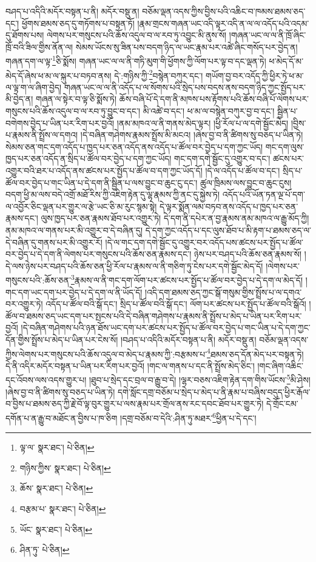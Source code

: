 བཤད་པ་འདིའི་མདོར་བསྟན་པ་ནི། མདོར་བསྡུ་ན། བཅོམ་ལྡན་འདས་ཀྱིས་བྱིས་པའི་འཆིང་བ་ཁམས་ཐམས་ཅད་དང་། ཕྱོགས་ཐམས་ཅད་དུ་གཏོགས་པ་བསྟན་ཏོ། །རྣམ་གྲངས་གཞན་ཡང་འདི་ལྟར་འདི་ན་ལ་ལ་འདོད་པའི་འདམ་དུ་ཐོགས་པས། ལེགས་པར་གསུངས་པའི་ཆོས་འདུལ་བ་ལ་རབ་ཏུ་འབྱུང་མི་ནུས་སོ། །གཞན་ཡང་ལ་ལ་ནི་ཁྲོ་ཞིང་ཁྲོ་བའི་ཟིལ་གྱིས་ནོན་ལ། སེམས་ཡོངས་སུ་ཟིན་པས་བདག་ཉིད་ལ་ཡང་རྣམ་པར་འཚེ་ཞིང་གསོད་པར་བྱེད་ན། གཞན་དག་ལ་ལྟ་\footnote{ལྟ་ལ་  སྣར་ཐང་།  པེ་ཅིན། }ཅི་སྨོས། གཞན་ཡང་ལ་ལ་ནི་གཏི་མུག་གི་ཕྱོགས་ཀྱི་ལོག་པར་ལྟ་བ་དང་ལྡན་ཏེ། ཕ་མེད་དོ་མ་མེད་དོ་ཞེས་ཕ་མ་ལ་སྐུར་པ་བཏབ་ནས། དེ་:གཉིས་ཀྱི་\footnote{གཉིས་ཀྱིས་  སྣར་ཐང་།  པེ་ཅིན། }བསྙེན་བཀུར་དང་། གཡོག་བྱ་བར་འདོད་ཀྱི་ཕྱིར་ཏེ་ཕ་མ་ལ་ལྟ་ག་ལ་ཞིག་བྱེད། གཞན་ཡང་ལ་ལ་ནི་འདོད་པ་ལ་སོགས་པའི་སྲེད་པས་བདས་ནས་བདག་ཉིད་ཀྱང་སྤྱོད་པར་མི་བྱེད་ན། གཞན་ལ་སྟེར་བ་ལྟ་ཅི་སྨོས་ཏེ། ཆོས་བཞི་པོ་དེ་དག་ནི་མཁས་པས་རྟོགས་པའི་ཆོས་བཞི་པོ་ལེགས་པར་གསུངས་པའི་ཆོས་འདུལ་བ་ལ་རབ་ཏུ་བྱུང་བ་དང་། མི་འཚེ་བ་དང་། ཕ་མ་ལ་བསྙེན་བཀུར་བྱ་བ་དང་། སྦྱིན་པ་བགེགས་བྱེད་པ་ཡིན་པར་རིག་པར་བྱའོ། །ནམ་མཁའ་ལ་ནི་གནས་མེད་ལྟར། །ཕྱི་རོལ་པ་ལ་དགེ་སྦྱོང་མེད། །བྱིས་པ་རྣམས་ནི་སྤྲོས་ལ་དགའ། །དེ་བཞིན་གཤེགས་རྣམས་སྤྲོས་མི་མངའ། །ཞེས་བྱ་བ་ནི་ཚིགས་སུ་བཅད་པ་ཡིན་ཏེ། སེམས་ཅན་གང་དག་འདོད་པ་ཁྱད་པར་ཅན་འདོད་ནས་འདོད་པ་ཚོལ་བར་བྱེད་པ་དག་ཀྱང་ཡོད། གང་དག་ལུས་ཁྱད་པར་ཅན་འདོད་ན་སྲིད་པ་ཚོལ་བར་བྱེད་པ་དག་ཀྱང་ཡོད། གང་དག་དགེ་སྦྱོང་དུ་འགྱུར་བ་དང་། ཚངས་པར་འགྱུར་བའི་ཐར་པ་འདོད་ནས་ཚངས་པར་སྤྱོད་པ་ཚོལ་བ་དག་ཀྱང་ཡོད་དོ། །དེ་ལ་འདོད་པ་ཚོལ་བ་དང་། སྲིད་པ་ཚོལ་བར་བྱེད་པ་གང་ཡིན་པ་དེ་དག་ནི་སྦྱིན་པ་ལས་བྱུང་བ་ཆུང་ངུ་དང་། ཚུལ་ཁྲིམས་ལས་བྱུང་བ་ཆུང་ངུས། བདག་ཕྱི་མ་ལས་བདེ་འགྲོ་མཐོ་རིས་ཀྱི་འཇིག་རྟེན་དུ་ལྷ་རྣམས་ཀྱི་ནང་དུ་སྐྱེས་ཏེ། འདོད་པའི་ཡོན་ཏན་ལྔ་པོ་དག་ལ་འབྱོར་ཅིང་ལྡན་པར་གྱུར་ལ་རྩེ་ཡང་ཅི་མ་རུང་སྙམ་སྟེ། དེ་ལྟར་སྨོན་ལམ་བཏབ་ནས་འདོད་པ་ཁྱད་པར་ཅན་རྣམས་དང་། ལུས་ཁྱད་པར་ཅན་རྣམས་ཐོབ་པར་འགྱུར་ཏེ། དེ་དག་ནི་དཔེར་ན་བྱ་རྣམས་ནམ་མཁའ་ལ་རྒྱུ་མོད་ཀྱི། ནམ་མཁའ་ལ་གནས་པར་མི་འགྱུར་བ་དེ་བཞིན་དུ། དེ་དག་ཀྱང་འདོད་པ་དང་ལུས་ཐོབ་པ་མི་རྟག་པ་ཐམས་ཅད་ལ་དེ་བཞིན་དུ་གནས་པར་མི་འགྱུར་རོ། །དེ་ལ་གང་དག་དགེ་སྦྱོང་དུ་འགྱུར་བར་འདོད་པས་ཚངས་པར་སྤྱོད་པ་ཚོལ་བར་བྱེད་པ་དེ་དག་ནི་ལེགས་པར་གསུངས་པའི་ཆོས་ཅན་རྣམས་དང་། ཉེས་པར་བཤད་པའི་ཆོས་ཅན་རྣམས་སོ། །དེ་ལས་ཉེས་པར་བཤད་པའི་ཆོས་ཅན་ཕྱི་རོལ་པ་རྣམས་ལ་ནི་གཅིག་ཏུ་ངེས་པར་དགེ་སྦྱོང་མེད་དོ། །ལེགས་པར་གསུངས་པའི་:ཆོས་ཅན་\footnote{ཆོས་  སྣར་ཐང་།  པེ་ཅིན། }རྣམས་ལ་ནི་གང་དག་ལོག་པར་ཚངས་པར་སྤྱོད་པ་ཚོལ་བར་བྱེད་པ་དེ་དག་ལ་མེད་དོ། །གང་དག་ཡང་དག་པར་བྱེད་པ་དེ་དག་ལ་ནི་ཡོད་དོ། །འདི་དག་ཐམས་ཅད་ཀྱང་སྒོ་གསུམ་གྱིས་སྤྲོས་པ་ལ་དགའ་བར་འགྱུར་ཏེ། འདོད་པ་ཚོལ་བའི་སྒོ་དང་། སྲིད་པ་ཚོལ་བའི་སྒོ་དང་། ལོག་པར་ཚངས་པར་སྤྱོད་པ་ཚོལ་བའི་སྒོའོ། །ཚོལ་བ་ཐམས་ཅད་ཡང་དག་པར་སྤངས་པའི་དེ་བཞིན་གཤེགས་པ་རྣམས་ནི་སྤྲོས་པ་མེད་པ་ཡིན་པར་རིག་པར་བྱའོ། །དེ་བཞིན་གཤེགས་པའི་ཉན་ཐོས་ཡང་དག་པར་ཚངས་པར་སྤྱོད་པ་ཚོལ་བར་བྱེད་པ་གང་ཡིན་པ་དེ་དག་ཀྱང་དོན་གྱིས་སྤྲོས་པ་མེད་པ་ཡིན་པར་ངེས་སོ། །བཤད་པ་འདིའི་མདོར་བསྟན་པ་ནི། མདོར་བསྡུ་ན། བཅོམ་ལྡན་འདས་ཀྱིས་ལེགས་པར་གསུངས་པའི་ཆོས་འདུལ་བ་མེད་པ་རྣམས་ཀྱི་:བརྩམས་པ་\footnote{བརྩམ་པ་  སྣར་ཐང་།  པེ་ཅིན། }ཐམས་ཅད་དོན་མེད་པར་བསྟན་ཏེ། དེ་ནི་འདིར་མདོར་བསྟན་པ་ཡིན་པར་རིག་པར་བྱའོ། །གང་ལ་གནས་པ་དང་ནི་སྤྲོས་མེད་ཅིང་། །གང་ཞིག་འཆིང་དང་འོབས་ལས་འདས་གྱུར་པ། །ཐུབ་པ་སྲེད་དང་བྲལ་བ་རྒྱུ་བ་དེ། །ལྷར་བཅས་འཇིག་རྟེན་དག་གིས་ཡོངས་\footnote{ཡོང་  སྣར་ཐང་།  པེ་ཅིན། }མི་ཤེས། །ཞེས་བྱ་བ་ནི་ཚིགས་སུ་བཅད་པ་ཡིན་ཏེ། དགེ་སློང་དགྲ་བཅོམ་པ་སྲེད་པ་མེད་པ་ནི་རྣམ་པ་བཞིས་བདུད་ཕྱིར་རྒོལ་བ་བྱིས་པ་ཐམས་ཅད་ཀྱི་རྗེ་བོ་ལྟ་བུར་གྱུར་པ་ལས་རྣམ་པར་གྲོལ་ནས་རང་དབང་ཐོབ་པར་གྱུར་ཏེ། དེ་གྲོང་ངམ་དགོན་པ་ན་རྒྱུ་བ་མཐོང་ན་བྱིས་པ་ཁ་ཅིག །དགྲ་བཅོམ་བ་དེའི་:ཤིན་ཏུ་མཐར་\footnote{ཤིན་ཏུ་  པེ་ཅིན། }ཕྱིན་པ་དེ་དང་། 